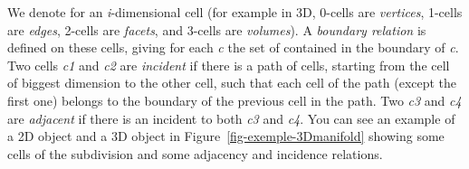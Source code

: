 We denote  for an \emph{i}-dimensional cell (for example in 3D,
0-cells are \emph{vertices}, 1-cells are \emph{edges}, 2-cells are
\emph{facets}, and 3-cells are \emph{volumes}). A \emph{boundary
  relation} is defined on these cells, giving for each  \emph{c}
the set of  contained in the boundary of \emph{c}.  Two cells
\emph{c1} and \emph{c2} are \emph{incident} if there is a path of cells,
starting from the cell of biggest dimension to the other cell, such
that each cell of the path (except the first one) belongs to the
boundary of the previous cell in the path. Two  \emph{c3} and \emph{c4} are \emph{adjacent} if there is an  incident to both \emph{c3}
and \emph{c4}.  You can see an example of a 2D object and a 3D object in
Figure~\ref{fig-exemple-3Dmanifold} showing some cells of the
subdivision and some adjacency and incidence relations.
